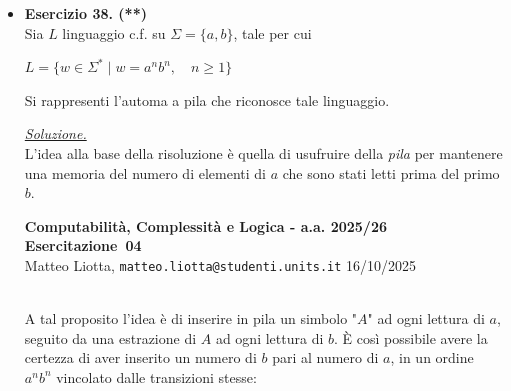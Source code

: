 \documentclass[a4paper,10pt]{article}
\makeatletter
\newcommand{\EsercitazioneNum}{04}
\newcommand{\Data}{16/10/2025}
\newcommand{\DocType}{Esercitazione} %
\newcommand{\FullTitle}{\DocType\ \EsercitazioneNum}
\newcommand{\Header}{
\noindent
  \small \textbf{Computabilità, Complessità e Logica - a.a. 2025/26} \hfill \textbf{\FullTitle} \\[0.2cm]
  \scriptsize Matteo Liotta, \texttt{matteo.liotta@studenti.units.it} \hfill \Data \\[0.2cm]
  \noindent\makebox[\linewidth]{\rule{\linewidth}{0.4pt}} \\[0.3cm]}
\newcommand{\NewPageHeader}{
  \vfill
  \noindent\makebox[\linewidth]{\rule{\linewidth}{0.4pt}}
  \newpage
  {\Header}
}
\makeatother
\begin{document}
{\begin{itemize}[label=, leftmargin=0pt]
\begin{osservazioni}
{\begin{center}
    \end{center}
    }
    \end{osservazioni}


    
    \item \textbf{Esercizio 38. (**)}\\ 
    Sia $L$ linguaggio c.f. su $\Sigma=\{a,b\}$, tale per cui 
    {\begin{center}
        $L = \{ w\in \Sigma^* \mid w=a^nb^n,\quad n\geq1\}$\\
    \end{center}}
    Si rappresenti l'automa a pila che riconosce tale linguaggio.

\begin{osservazioni}
    \underline{\textit{Soluzione.}}\\
    L'idea alla base della risoluzione è quella di usufruire della \textit{pila} per mantenere una memoria del numero di elementi di $a$ che sono stati letti prima del primo $b$. 
\end{osservazioni}
    
\NewPageHeader

\begin{osservazioni}
    A tal proposito l'idea è di inserire in pila un simbolo "$A$" ad ogni lettura di $a$, seguito da una estrazione di $A$ ad ogni lettura di $b$. È così possibile avere la certezza di aver inserito un numero di $b$ pari al numero di $a$, in un ordine $a^nb^n$ vincolato dalle transizioni stesse:

    
      {
    \small
    \begin{center}
\end{center}}
\end{osservazioni}
\end{itemize}}
\end{document}
